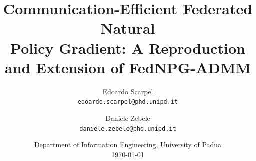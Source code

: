 \documentclass[11pt,a4paper]{article}
\title{\textbf{Communication-Efficient Federated Natural \\
Policy Gradient: A Reproduction \\
and Extension of FedNPG-ADMM}}
\author{
  Edoardo Scarpel \\
  \texttt{edoardo.scarpel@phd.unipd.it}
  \and
  Daniele Zebele \\
  \texttt{daniele.zebele@phd.unipd.it}
}
\date{Department of Information Engineering, University of Padua \\[2pt] \today}
\begin{document}
\maketitle

\begin{abstract}

\end{abstract}














\appendix

\end{document}
